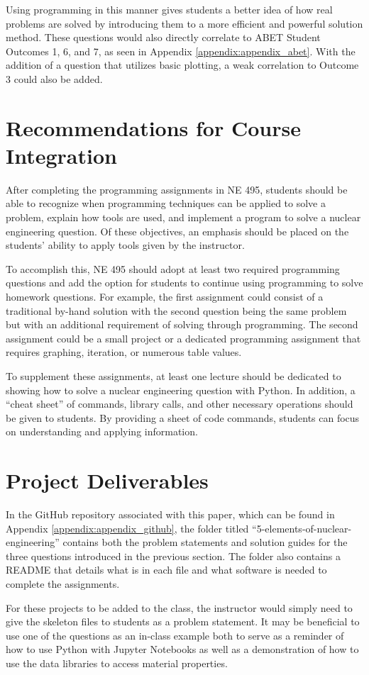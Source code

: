 Using programming in this manner gives students a better idea of how real problems are solved by
introducing them to a more efficient and powerful solution method. These questions would also 
directly correlate to ABET Student Outcomes 1, 6, and 7, as seen in Appendix 
\ref{appendix:appendix_abet}. With the addition of a question that utilizes basic plotting, a 
weak correlation to Outcome 3 could also be added.

\section{Recommendations for Course Integration}

After completing the programming assignments in NE 495, students should be able to recognize when programming
techniques can be applied to solve a problem, explain how tools are used, and implement a program to solve 
a nuclear engineering question. Of these objectives, an emphasis should be placed on the students' ability to apply
tools given by the instructor.

To accomplish this, NE 495 should adopt at least two required programming questions and add the option for 
students to continue using programming to solve homework questions. For example, the first assignment could
consist of a traditional by-hand solution with the second question being the same problem but with an additional
requirement of solving through programming. The second assignment could be a small project or a dedicated
programming assignment that requires graphing, iteration, or numerous table values. 

To supplement these assignments, at least one lecture should be dedicated to showing how to solve a nuclear 
engineering question with Python. In addition, a ``cheat sheet'' of commands, library calls, and other 
necessary operations should be given to students. By providing a sheet of code commands, students can focus 
on understanding and applying information.

\section{Project Deliverables}

In the GitHub repository associated with this paper, which can be found in 
Appendix \ref{appendix:appendix_github}, the folder titled ``5-elements-of-nuclear-engineering''
contains both the problem statements and solution guides for the three questions introduced in 
the previous section. The folder also contains a README that details what is in each file and 
what software is needed to complete the assignments. 

For these projects to be added to the class, the instructor would simply need to give the 
skeleton files to students as a problem statement. It may be beneficial to use one of the questions 
as an in-class example both to serve as a reminder of how to use Python with Jupyter Notebooks 
as well as a demonstration of how to use the data libraries to access material properties.